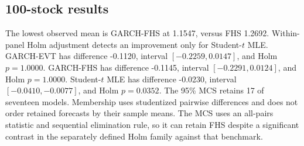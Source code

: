 \documentclass[11pt]{article}
\theoremstyle{definition}\newtheorem{definition}[theorem]{Definition}
\theoremstyle{remark}\newtheorem{remark}[theorem]{Remark}
\begin{document}
\subsection{100-stock results}
The lowest observed mean is GARCH-FHS at 1.1547, versus FHS 1.2692. Within-panel Holm adjustment detects an improvement only for Student-$t$ MLE. GARCH-EVT has difference -0.1120, interval $[-0.2259,0.0147]$, and Holm $p=1.0000$. GARCH-FHS has difference -0.1145, interval $[-0.2291,0.0124]$, and Holm $p=1.0000$. Student-$t$ MLE has difference -0.0230, interval $[-0.0410,-0.0077]$, and Holm $p=0.0352$. The 95\% MCS retains 17 of seventeen models. Membership uses studentized pairwise differences and does not order retained forecasts by their sample means.
The MCS uses an all-pairs statistic and sequential elimination rule, so it can retain FHS despite a significant contrast in the separately defined Holm family against that benchmark.
\end{document}
